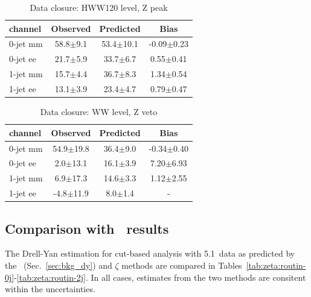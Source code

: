 \begin{table}[!hbtp]
{
 \begin{center}
 \begin{tabular}{l | c c c}
 \hline
channel       & Observed & Predicted & Bias \\
 \hline
0-jet  mm &   58.8$\pm$9.1   &   53.4$\pm$10.1  &  -0.09$\pm$0.23    \\
0-jet  ee &   21.7$\pm$5.9   &   33.7$\pm$6.7   &   0.55$\pm$0.41    \\
 \hline
1-jet  mm &   15.7$\pm$4.4   &   36.7$\pm$8.3   &   1.34$\pm$0.54    \\
1-jet  ee &   13.1$\pm$3.9   &   23.4$\pm$4.7   &   0.79$\pm$0.47    \\
 \hline
\end{tabular}
\end{center}
}
\caption{Data closure: HWW120 level, Z peak}
\label{tab:zeta:datacloseHWWzp}
\end{table}

\begin{table}[!hbtp]
{
 \begin{center}
 \begin{tabular}{l | c c c}
 \hline
channel       & Observed & Predicted & Bias \\
 \hline
0-jet  mm &   54.9$\pm$19.8   &   36.4$\pm$9.0    &  -0.34$\pm$0.40     \\
0-jet  ee &    2.0$\pm$13.1   &   16.1$\pm$3.9    &   7.20$\pm$6.93     \\
 \hline
1-jet  mm &    6.9$\pm$17.3   &   14.6$\pm$3.3    &   1.12$\pm$2.55     \\
1-jet  ee &   -4.8$\pm$11.9   &    8.0$\pm$1.4    &   -     \\
 \hline
\end{tabular}
\end{center}
}
\caption{Data closure: WW level, Z veto}
\label{tab:zeta:datacloseWWzv}
\end{table}


\subsection{Comparison with \routin\ results}

The Drell-Yan estimation for cut-based analysis with 5.1~\ifb data as predicted by the \routin\ (Sec.~\ref{sec:bkg_dy}) and $\zeta$ methods are 
compared in Tables~\ref{tab:zeta:routin-0j}-\ref{tab:zeta:routin-2j}.
In all cases, estimates from the two methods are consitent within the uncertainties.


